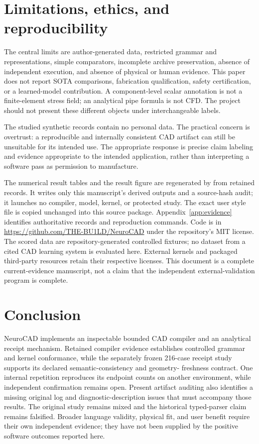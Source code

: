 \documentclass[10pt]{article}
\begin{document}
\section{Limitations, ethics, and reproducibility}

The central limits are author-generated data, restricted grammar and
representations, simple comparators, incomplete archive preservation, absence
of independent execution, and absence of physical or human evidence. This
paper does not report SOTA comparisons, fabrication qualification, safety
certification, or a learned-model contribution. A component-level scalar
annotation is not a finite-element stress field; an analytical pipe formula
is not CFD. The project should not present these different objects under
interchangeable labels.

The studied synthetic records contain no personal data. The practical concern
is overtrust: a reproducible and internally consistent CAD artifact can still
be unsuitable for its intended use. The appropriate response is precise
claim labeling and evidence appropriate to the intended application, rather
than interpreting a software pass as permission to manufacture.

The numerical result tables and the result figure are regenerated by
 from retained records.
It writes only this manuscript's derived outputs and a source-hash audit;
it launches no compiler, model, kernel, or protected study. The exact user
style file is copied unchanged into this source package. Appendix~\ref{app:evidence}
identifies authoritative records and reproduction commands. Code is in
\url{https://github.com/THE-BU1LD/NeuroCAD} under the repository's MIT license.
The scored data are repository-generated controlled fixtures; no dataset
from a cited CAD learning system is evaluated here. External kernels and
packaged third-party resources retain their respective licenses. This
document is a complete current-evidence manuscript,
not a claim that the independent external-validation program is complete.

\section{Conclusion}

NeuroCAD implements an inspectable bounded CAD compiler and an analytical
receipt mechanism. Retained compiler evidence establishes controlled
grammar and kernel conformance, while the separately frozen 216-case
receipt study supports its declared semantic-consistency and geometry-
freshness contract. One internal repetition reproduces its endpoint counts
on another environment, while independent confirmation remains open.
Present artifact auditing also identifies a missing
original log and diagnostic-description issues that must accompany those
results. The original study remains mixed and the historical typed-parser
claim remains falsified. Broader language validity, physical fit, and user
benefit require their own independent evidence; they have not been supplied
by the positive software outcomes reported here.
\end{document}
